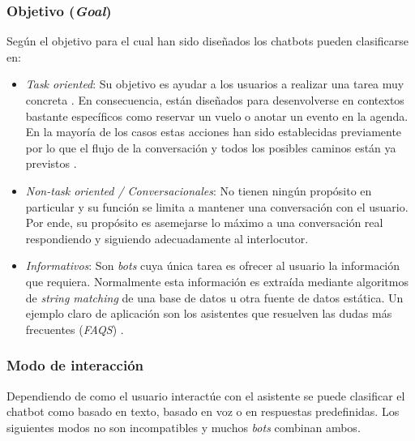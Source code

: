 \subsubsection{Objetivo (\textit{Goal})}
Según el objetivo para el cual han sido diseñados los chatbots pueden clasificarse en:

\begin{itemize}
  \item \textit{Task oriented}: Su objetivo es ayudar a los usuarios a realizar una tarea muy concreta \cite{designTechniques}. En consecuencia, están diseñados para desenvolverse en contextos bastante específicos como reservar un vuelo o anotar un evento en la agenda. En la mayoría de los casos estas acciones han sido establecidas previamente por lo que el flujo de la conversación y todos los posibles caminos están ya previstos \cite{chatbotTypes}.
  \item \textit {Non-task oriented / Conversacionales}: No tienen ningún propósito en particular y su función se limita a mantener una conversación con el usuario. Por ende, su propósito es asemejarse lo máximo a una conversación real respondiendo y siguiendo adecuadamente al interlocutor.
  \item \textit {Informativos}: Son \textit{bots} cuya única tarea es ofrecer al usuario la información que requiera. Normalmente esta información es extraída mediante algoritmos de \textit{string matching} de una base de datos u otra fuente de datos estática. Un ejemplo claro de aplicación son los asistentes que resuelven las dudas más frecuentes (\textit{FAQS}) \cite{chatbotTypes}.
\end{itemize}


\subsubsection{Modo de interacción}
Dependiendo de como el usuario interactúe con el asistente se puede clasificar el chatbot como basado en texto, basado en voz o en respuestas predefinidas. Los siguientes modos no son incompatibles y muchos \textit{bots} combinan ambos.



